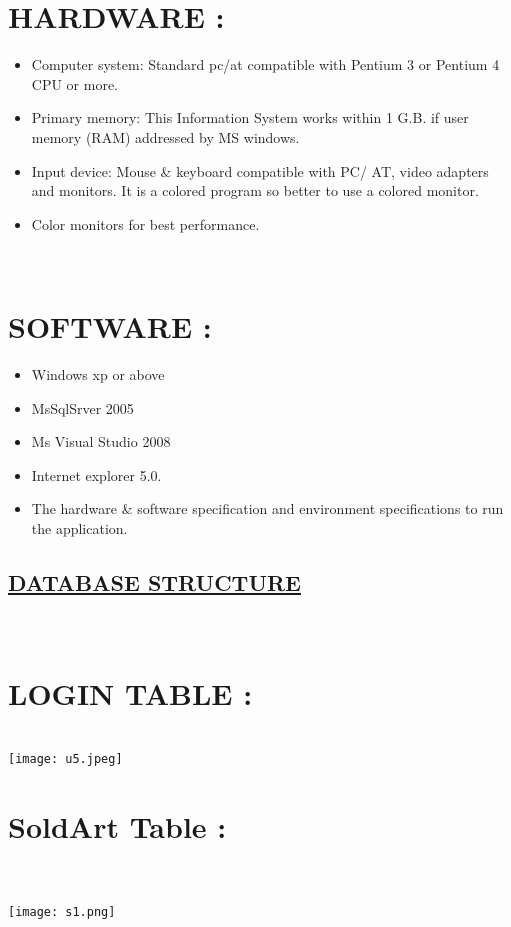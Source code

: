 \documentclass{article}
\begin{document}
\section*{HARDWARE : }
\begin{itemize}
    \item Computer system: Standard pc/at compatible with Pentium 3 or Pentium 4 CPU or more.
\item  Primary memory: This Information System works within 1 G.B. if user memory (RAM) addressed by MS windows.
\item Input device:  Mouse & keyboard compatible with PC/ AT, video adapters and   monitors. It is a colored program so better to use a colored monitor.
\item Color monitors for best   performance.
\end{itemize}
\\
\section*{SOFTWARE : }
\begin{itemize}
    \item  Windows xp or above
\item  MsSqlSrver 2005
\item Ms Visual Studio 2008
\item  Internet explorer 5.0.
\item The hardware & software specification and environment specifications to run the application.
\end{itemize}
\begin{center}
   \section*{\underline{\textbf{DATABASE STRUCTURE}}} 
\end{center}
\\
\section*{LOGIN TABLE : }
\\
\texttt{[image: u5.jpeg]}
\section*{SoldArt Table : }
\\
\\
\texttt{[image: s1.png]}
\maketitle
\end{document}
